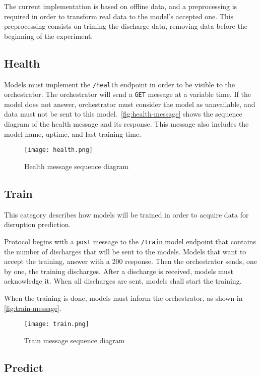 The current implementation is based on offline data, and a preprocessing is required in order to transform real data to the model's accepted one. This preprocessing consists on triming the discharge data, removing data before the beginning of the experiment.

\subsection{Health}

Models must implement the \texttt{/health} endpoint in order to be visible to the orchestrator. The orchestrator will send a \texttt{GET} message at a variable time. If the model does not answer, orchestrator must consider the model as unavailable, and data must not be sent to this model.\ \autoref{fig:health-message} shows the sequence diagram of the health message and its response. This message also includes the model name, uptime, and last training time.

\begin{figure}[H]
    \centering
    \texttt{[image: health.png]}
    \caption{Health message sequence diagram}
    \label{fig:health-message}
\end{figure}

\subsection{Train} 

This category describes how models will be trained in order to acquire data for disruption prediction. 

Protocol begins with a \texttt{post} message to the \texttt{/train} model endpoint that contains the number of discharges that will be sent to the models. Models that want to accept the training, answer with a 200 response. Then the orchestrator sends, one by one, the training discharges. After a discharge is received, models must acknowledge it. When all discharges are sent, models shall start the training.

When the training is done, models must inform the orchestrator, as shown in \autoref{fig:train-message}.

\begin{figure}[H]
    \centering
    \texttt{[image: train.png]}
    \caption{Train message sequence diagram}
    \label{fig:train-message}
\end{figure}

\subsection{Predict}


